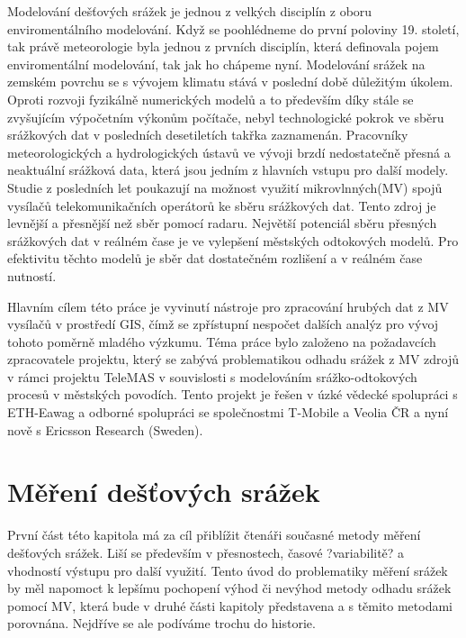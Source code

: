 \documentclass[a4paper,12pt]{article}
\begin{document}
Modelování dešťových srážek je jednou z velkých disciplín z oboru enviromentálního modelování. Když se poohlédneme do první poloviny 19. století, tak právě meteorologie byla jednou z prvních disciplín, která definovala pojem enviromentální modelování, tak jak ho chápeme nyní. Modelování srážek na zemském povrchu se s vývojem klimatu stává v poslední době důležitým úkolem. Oproti rozvoji fyzikálně numerických modelů a to především díky stále se zvyšujícím výpočetním výkonům počítače, nebyl technologické pokrok ve sběru srážkových dat v posledních desetiletích takřka zaznamenán. Pracovníky meteorologických a hydrologických ústavů ve vývoji brzdí nedostatečně přesná a neaktuální srážková data, která jsou jedním z hlavních vstupu pro další modely. Studie z posledních let poukazují na možnost využití mikrovlnných(MV) spojů vysílačů telekomunikačních operátorů ke sběru srážkových dat. Tento zdroj je levnější a přesnější než sběr pomocí radaru.\cite{radar_meterology} Největší potenciál sběru přesných srážkových dat v reálném čase je ve vylepšení městských odtokových modelů. Pro efektivitu těchto modelů je sběr dat dostatečném rozlišení a v reálném čase nutností.

Hlavním cílem této práce je vyvinutí nástroje pro zpracování hrubých dat z MV vysílačů v prostředí GIS, čímž se zpřístupní nespočet dalších analýz pro vývoj tohoto poměrně mladého výzkumu. Téma práce bylo založeno na požadavcích zpracovatele projektu, který se zabývá problematikou odhadu srážek z MV zdrojů v rámci projektu TeleMAS v souvislosti s modelováním srážko-odtokových procesů v městských povodích. Tento projekt je řešen v úzké vědecké spolupráci s ETH-Eawag a odborné spolupráci se společnostmi T-Mobile a Veolia ČR a nyní nově s Ericsson Research (Sweden).  

 




\newpage
\section{Měření dešťových srážek}
První část této kapitola má za cíl přiblížit čtenáři současné metody měření dešťových srážek. Liší se především v přesnostech, časové ?variabilitě? a vhodností výstupu pro další využití. Tento úvod do problematiky měření srážek by měl napomoct k lepšímu pochopení výhod či nevýhod metody odhadu srážek pomocí MV, která bude v druhé části kapitoly představena a s těmito metodami porovnána. Nejdříve se ale podíváme trochu do historie.
\end{document}
